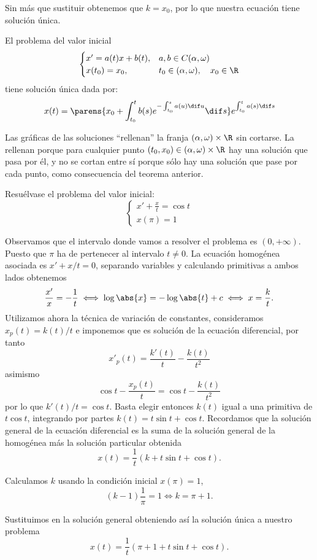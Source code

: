 \documentclass[../main.tex]{subfiles}
\begin{document}
Sin más que sustituir obtenemos que \(k = x_0\), por lo que nuestra ecuación
tiene solución única.

\begin{theorem}
	El problema del valor inicial
	\[
	\begin{cases}
		x' = a(t)x + b(t), & a, b \in C(\alpha, \omega) \\
		x(t_0) = x_0, 	  & t_0 \in (\alpha, \omega), \quad x_0 \in \R
	\end{cases}
	\]
	tiene solución única dada por:
	\[x(t) =
		\parens{x_0 + \int_{t_0}^t b(s) e^{-\int_{t_0}^s a(u) \dif u} \dif s}
		e^{\int_{t_0}^t a(s) \dif s}\]
\end{theorem}

Las gráficas de las soluciones ``rellenan'' la franja
\((\alpha, \omega) \times \R\) sin cortarse. La rellenan porque para cualquier
punto \((t_0, x_0) \in (\alpha, \omega) \times \R\) hay una solución que pasa
por él, y no se cortan entre sí porque sólo hay una solución que pase por cada
punto, como consecuencia del teorema anterior.

\begin{example}
	Resuélvase el problema del valor inicial:
	\[
	\begin{cases}
		x' + \frac{x}{t} = \cos t \\
		x(\pi) = 1
	\end{cases}
	\]
\end{example}

\begin{solution}
	Observamos que el intervalo donde vamos a resolver el problema es
	\((0, +\infty)\). Puesto que \(\pi\) ha de pertenecer al intervalo
	\(t \neq 0\). La ecuación homogénea asociada es \(x' + x/t = 0\),
	separando variables y calculando primitivas a ambos lados obtenemos
	\[\frac{x'}{x} = -\frac{1}{t} \iff \log\abs{x}
		= -\log\abs{t} + c \iff x = \frac{k}{t}.\]
	Utilizamos ahora la técnica de variación de constantes, consideramos
	\(x_p(t) = k(t)/t\) e imponemos que es solución de la ecuación diferencial,
	por tanto
	\[x'_p(t) = \frac{k'(t)}{t} - \frac{k(t)}{t^2}\]
	asimismo
	\[\cos t - \frac{x_p(t)}{t} = \cos t - \frac{k(t)}{t^2}\]
	por lo que \(k'(t)/t = \cos t\). Basta elegir entonces \(k(t)\) igual a una
	primitiva de \(t \cos t\), integrando por partes
	\(k(t) = t \sin t + \cos t\). Recordamos que la solución general de la
	ecuación diferencial es la suma de la solución general de la homogénea más
	la solución particular obtenida
	\[x(t) = \frac{1}{t}(k + t \sin t + \cos t).\]

	Calculamos \(k\) usando la condición inicial \(x(\pi) = 1\),
	\[(k - 1)\frac{1}{\pi} = 1 \iff k = \pi + 1.\]

	Sustituimos en la solución general obteniendo así la solución única a
	nuestro problema
	\[x(t) = \frac{1}{t}(\pi + 1 + t \sin t + \cos t).\]
\end{solution}
\end{document}
